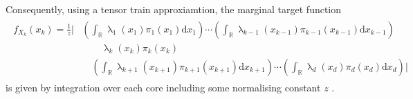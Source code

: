 Consequently, using a tensor train approxiamtion, the marginal target function
\begin{align}
	\begin{split}
	f_{X_k}(x_k) = \frac{1}{z}
	\Big|  &\left( \int_{\mathbb{R}} \uplambda_1(x_1) \pi_{1}(x_1)\text{d}x_{1} \right) \cdots \left( \int_{\mathbb{R}} \uplambda_{k-1}(x_{k-1}) \pi_{k-1}(x_{k-1}) \text{d}x_{k-1} \right) \\ & \qquad \uplambda_k(x_{k}) \pi_{k}(x_k) \\ &\quad \left( \int_{\mathbb{R}} \uplambda_{k+1}(x_{k+1}) \pi_{k+1}(x_{k+1})\text{d}x_{k+1} \right) \cdots  \left( \int_{\mathbb{R}} \uplambda_d(x_{d}) \pi_{d}(x_d)\text{d}x_d \right) \Big| \, 
	\end{split} 
\end{align}  
is given by integration over each core \cite{dolgov2020approximation} including some normalising constant $z$ \cite{cui2022deep}.
\\


